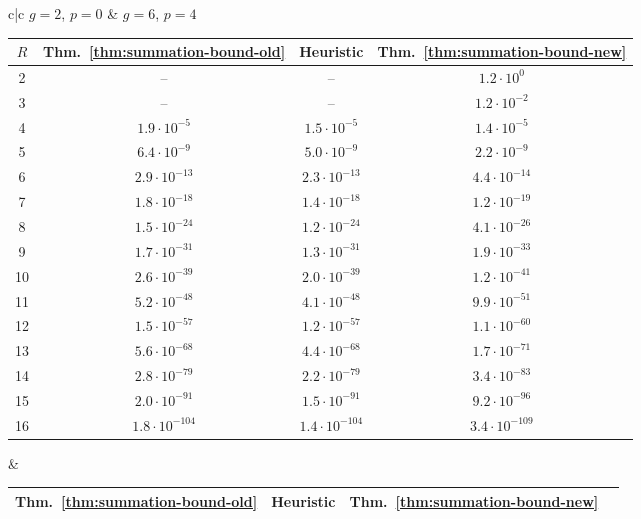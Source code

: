 \documentclass[12pt,oneside]{amsart}
\numberwithin{equation}{section}
\theoremstyle{definition}
\begin{document}
\begin{figure}[ht]
  \centering
  \begin{tabular}{c|c}
    $g = 2$, $p = 0$ & $g = 6$, $p = 4$ \\[6pt]

    \begin{tabular}{cccc}
      $R$ & Thm.~\ref{thm:summation-bound-old}
      & Heuristic & Thm.~\ref{thm:summation-bound-new} \\\hline
      2 & -- & -- & $ 1.2 \cdot 10^0 $ \\
      3 & -- & -- & %
      $1.2\cdot 10^{-2}$ \\
      4 & %
          $1.9\cdot 10^{-5}$ & %
                               $1.5\cdot 10^{-5}$ & %
      $1.4\cdot 10^{-5}$ \\
      5 & $ 6.4 \cdot 10^{-9} $ & $ 5.0 \cdot 10^{-9} $ & $ 2.2 \cdot 10^{-9} $ \\
      6 & $ 2.9 \cdot 10^{-13} $ & $ 2.3 \cdot 10^{-13} $ & $ 4.4 \cdot 10^{-14} $ \\
      7 & $ 1.8 \cdot 10^{-18} $ & $ 1.4 \cdot 10^{-18} $ & $ 1.2 \cdot 10^{-19} $ \\
      8 & $ 1.5 \cdot 10^{-24} $ & $ 1.2 \cdot 10^{-24} $ & $ 4.1 \cdot 10^{-26} $ \\
      9 & $ 1.7 \cdot 10^{-31} $ & $ 1.3 \cdot 10^{-31} $ & $ 1.9 \cdot 10^{-33} $ \\
      10 & $ 2.6 \cdot 10^{-39} $ & $ 2.0 \cdot 10^{-39} $ & $ 1.2 \cdot 10^{-41} $ \\
      11 & $ 5.2 \cdot 10^{-48} $ & $ 4.1 \cdot 10^{-48} $ & $ 9.9 \cdot 10^{-51} $ \\
      12 & $ 1.5 \cdot 10^{-57} $ & $ 1.2 \cdot 10^{-57} $ & $ 1.1 \cdot 10^{-60} $ \\
      13 & $ 5.6 \cdot 10^{-68} $ & $ 4.4 \cdot 10^{-68} $ & $ 1.7 \cdot 10^{-71} $ \\
      14 & $ 2.8 \cdot 10^{-79} $ & $ 2.2 \cdot 10^{-79} $ & $ 3.4 \cdot 10^{-83} $ \\
      15 & $ 2.0 \cdot 10^{-91} $ & $ 1.5 \cdot 10^{-91} $ & $ 9.2 \cdot 10^{-96} $ \\
      16 & $ 1.8 \cdot 10^{-104} $ & $ 1.4 \cdot 10^{-104} $ & $ 3.4 \cdot 10^{-109} $ \\
    \end{tabular}
    &
    \begin{tabular}{cccc}
      Thm.~\ref{thm:summation-bound-old} & Heuristic & Thm.~\ref{thm:summation-bound-new} \\\hline

\end{tabular}
\end{tabular}
\end{figure}
\end{document}
